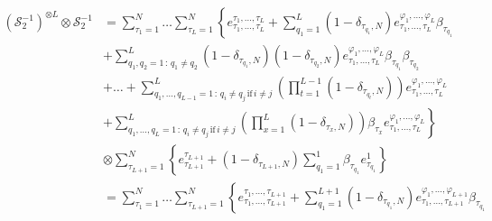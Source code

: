 \documentclass[10pt]{article}
\numberwithin{equation}{section}
\numberwithin{equation}{subsection}
\begin{document}
\begin{align*}
    	\left(\mathcal{S}_{2}^{-1}\right)^{\otimes L}\otimes \mathcal{S}_{2}^{-1}&=%
    	\sum_{\tau_{1}=1}^{N}\ldots\sum_{\tau_{L}=1}^{N}\left\{e_{\tau_{1},\ldots,\tau_{L}}^{\tau_{1},\ldots,\tau_{L}}+\sum_{q_{1}=1}^{L}(1-\delta_{\tau_{q_{1}},N})e_{\tau_{1},\ldots,\tau_{L}}^{\varphi_{1},\ldots,\varphi_{L}}\beta_{\tau_{q_{1}}}\right. 
    	\\&+\left. \sum_{q_{1},q_{2}=1\,:\,q_{1}\neq q_{2}}^{L}(1-\delta_{\tau_{q_{1}},N})(1-\delta_{\tau_{q_{2}},N})e^{\varphi_{1},\ldots,\varphi_{L}}_{\tau_{1},\ldots,\tau_{L}}\beta_{\tau_{q_{1}}}\beta_{\tau_{q_{2}}}\right.
    	\\&+\left.
    	\ldots+	\sum_{q_{1},\ldots,q_{L-1}=1\,:\,q_{i}\neq q_{j}\,\text{if}\,i\neq j}^{L}\left(\prod_{t=1}^{L-1}(1-\delta_{\tau_{q_{t}},N})\right)e_{\tau_{1},\ldots,\tau_{L}}^{\varphi_{1},\ldots,\varphi_{L}}
    	\right. \\&+ \left. 
    	\sum_{q_{1},\ldots,q_{L}=1\,:\,q_{i}\neq q_{j}\,\text{if}\,i\neq j}^{L}\left(\prod_{x=1}^{L}(1-\delta_{\tau_{x},N})\right)\beta_{\tau_{x}}e_{\tau_{1},\ldots,\tau_{L}}^{\varphi_{1},\ldots,\varphi_{L}} \right\}
    	\\&
    	\otimes \sum_{\tau_{L+1}=1}^{N}\left\{e_{\tau_{L+1}}^{\tau_{L+1}}+(1-\delta_{\tau_{L+1},N})\sum_{q_{1}=1}^{1}\beta_{\tau_{q_{1}}}e_{\tau_{q_{1}}}^{1}\right\}
    	\\&=
    	\sum_{\tau_{1}=1}^{N}\ldots\sum_{\tau_{L+1}=1}^{N}\left\{e_{\tau_{1},\ldots,\tau_{L+1}}^{\tau_{1},\ldots,\tau_{L+1}}+\sum_{q_{1}=1}^{L+1}(1-\delta_{\tau_{q_{1}},N})e_{\tau_{1},\ldots,\tau_{L+1}}^{\varphi_{1},\ldots,\varphi_{L+1}}\beta_{\tau_{q_{1}}}\right. 

\end{align*}
\end{document}
